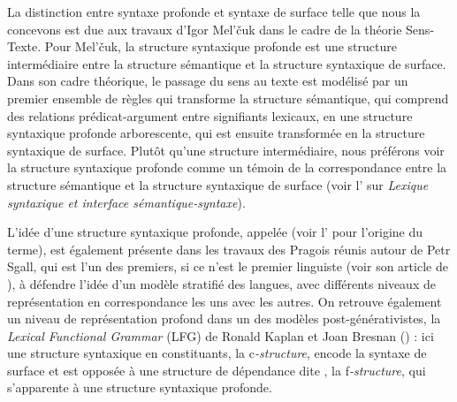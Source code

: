 {La distinction entre syntaxe profonde et syntaxe de surface telle que nous la concevons est due aux travaux d’Igor Mel’čuk dans le cadre de la théorie Sens-Texte. Pour Mel’čuk, la structure syntaxique profonde est une structure intermédiaire entre la structure sémantique et la structure syntaxique de surface. Dans son cadre théorique, le passage du sens au texte est modélisé par un premier ensemble de règles qui transforme la structure sémantique, qui comprend des relations prédicat-argument entre signifiants lexicaux, en une structure syntaxique profonde arborescente, qui est ensuite transformée en la structure syntaxique de surface. Plutôt qu’une structure intermédiaire, nous préférons voir la structure syntaxique profonde comme un témoin de la correspondance entre la structure sémantique et la structure syntaxique de surface (voir l’ sur \textit{Lexique syntaxique et interface sémantique-syntaxe}). 

L’idée d’une structure syntaxique profonde, appelée  (voir l’ pour l’origine du terme), est également présente dans les travaux des Pragois réunis autour de Petr Sgall, qui est l’un des premiers, si ce n’est le premier linguiste (voir son article de \citeyear{sgall1967functional}), à défendre l’idée d’un modèle stratifié des langues, avec différents niveaux de représentation en correspondance les uns avec les autres. On retrouve également un niveau de représentation profond dans un des modèles post-générativistes, la \textit{Lexical Functional Grammar} (LFG) de Ronald Kaplan et Joan Bresnan (\citeyear{kaplan1981lexical}) : ici une structure syntaxique en constituants, la c\textit{-structure}, encode la syntaxe de surface et est opposée à une structure de dépendance dite , la f\textit{-structure}, qui s’apparente à une structure syntaxique profonde.

}
